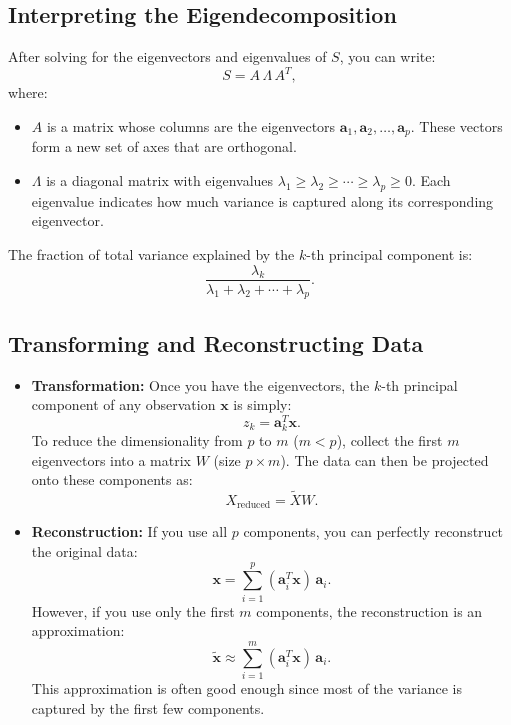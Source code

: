 \documentclass[10pt]{article}
\begin{document}
\subsection{Interpreting the Eigendecomposition}

After solving for the eigenvectors and eigenvalues of \(S\), you can write:
\[
S = A \, \Lambda \, A^T,
\]
where:
\begin{itemize}
    \item \(A\) is a matrix whose columns are the eigenvectors \(\boldsymbol{a}_1, \boldsymbol{a}_2, \dots, \boldsymbol{a}_p\). These vectors form a new set of axes that are orthogonal.
    \item \(\Lambda\) is a diagonal matrix with eigenvalues \(\lambda_1 \ge \lambda_2 \ge \cdots \ge \lambda_p \ge 0\). Each eigenvalue indicates how much variance is captured along its corresponding eigenvector.
\end{itemize}

The fraction of total variance explained by the \(k\)-th principal component is:
\[
\frac{\lambda_k}{\lambda_1 + \lambda_2 + \cdots + \lambda_p}.
\]

\subsection{Transforming and Reconstructing Data}

\begin{itemize}
    \item \textbf{Transformation:}  
    Once you have the eigenvectors, the \(k\)-th principal component of any observation \(\boldsymbol{x}\) is simply:
    \[
    z_k = \boldsymbol{a}_k^T \boldsymbol{x}.
    \]
    To reduce the dimensionality from \(p\) to \(m\) (\(m < p\)), collect the first \(m\) eigenvectors into a matrix \(W\) (size \(p \times m\)). The data can then be projected onto these components as:
    \[
    X_{\text{reduced}} = \tilde{X} W.
    \]

    \item \textbf{Reconstruction:}  
    If you use all \(p\) components, you can perfectly reconstruct the original data:
    \[
    \boldsymbol{x} = \sum_{i=1}^{p} (\boldsymbol{a}_i^T \boldsymbol{x}) \, \boldsymbol{a}_i.
    \]
    However, if you use only the first \(m\) components, the reconstruction is an approximation:
    \[
    \tilde{\boldsymbol{x}} \approx \sum_{i=1}^{m} (\boldsymbol{a}_i^T \boldsymbol{x}) \, \boldsymbol{a}_i.
    \]
    This approximation is often good enough since most of the variance is captured by the first few components.
\end{itemize}
\end{document}
